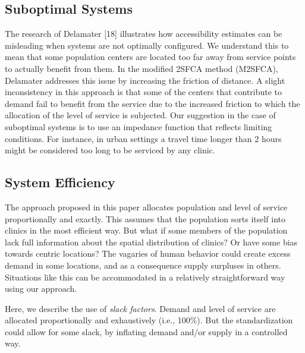 \documentclass[10pt,letterpaper]{article}
\begin{document}
\subsection{Suboptimal Systems}\label{suboptimal-systems}

The research of Delamater {[}18{]} illustrates how accessibility
estimates can be misleading when systems are not optimally configured.
We understand this to mean that some population centers are located too
far away from service points to actually benefit from them. In the
modified 2SFCA method (M2SFCA), Delamater addresses this issue by
increasing the friction of distance. A slight inconsistency in this
approach is that some of the centers that contribute to demand fail to
benefit from the service due to the increased friction to which the
allocation of the level of service is subjected. Our suggestion in the
case of suboptimal systems is to use an impedance function that reflects
limiting conditions. For instance, in urban settings a travel time
longer than 2 hours might be considered too long to be serviced by any
clinic.

\subsection{System Efficiency}\label{system-efficiency}

The approach proposed in this paper allocates population and level of
service proportionally and exactly. This assumes that the population
sorts itself into clinics in the most efficient way. But what if some
members of the population lack full information about the spatial
distribution of clinics? Or have some bias towards centric locations?
The vagaries of human behavior could create excess demand in some
locations, and as a consequence supply surpluses in others. Situations
like this can be accommodated in a relatively straightforward way using
our approach.

Here, we describe the use of \emph{slack factors}. Demand and level of
service are allocated proportionally and exhaustively (i.e., 100\%). But
the standardization could allow for some slack, by inflating demand
and/or supply in a controlled way.
\end{document}

